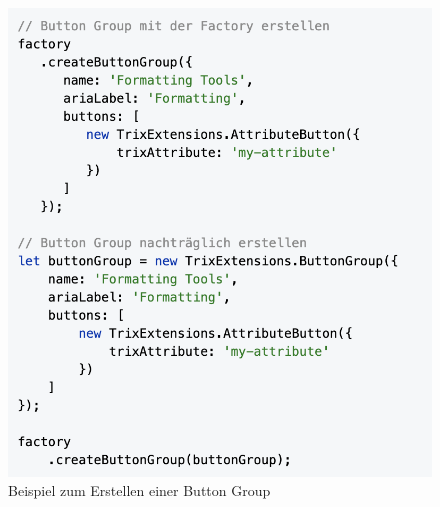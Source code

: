 \begin{figure}[H]
\begin{center}
	\includegraphics[scale=.7]{images/button-group-example.png}
\end{center}
	\caption{Beispiel zum Erstellen einer Button Group}
\end{figure}